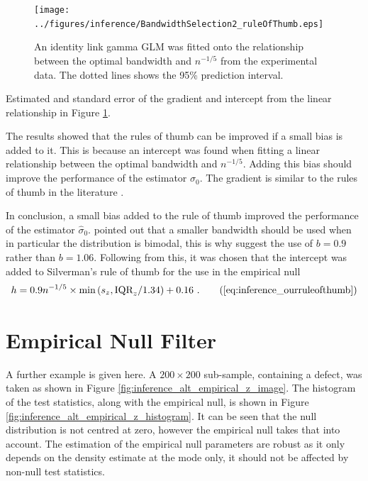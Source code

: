 \begin{figure}
  \centering
  \texttt{[image: ../figures/inference/BandwidthSelection2\_ruleOfThumb.eps]}
  \caption{An identity link gamma GLM was fitted onto the relationship between the optimal bandwidth and $n^{-1/5}$ from the experimental data. The dotted lines shows the 95\% prediction interval.}
  \label{fig:inference_BandwidthSelection2_ruleOfThumb}
\end{figure}

\begin{table}
  \centering
  
  \caption{Estimated and standard error of the gradient and intercept from the linear relationship in Figure \ref{fig:inference_BandwidthSelection2_ruleOfThumb}.}
  \label{table:inference_BandwidthSelection2_ruleOfThumb}
\end{table}

The results showed that the rules of thumb can be improved if a small bias is added to it. This is because an intercept was found when fitting a linear relationship between the optimal bandwidth and $n^{-1/5}$. Adding this bias should improve the performance of the estimator $\widehat{\sigma}_0$. The gradient is similar to the rules of thumb in the literature \citep{sheather2004density}.

In conclusion, a small bias added to the rule of thumb improved the performance of the estimator $\widehat{\sigma}_0$. \cite{silverman1986density} pointed out that a smaller bandwidth should be used when in particular the distribution is bimodal, this is why \cite{silverman1986density} suggest the use of $b=0.9$ rather than $b=1.06$. Following from this, it was chosen that the intercept was added to Silverman's rule of thumb for the use in the empirical null
\begin{equation}
  h = 0.9n^{-1/5}\times\text{min}\left(s_z,\text{IQR}_z/1.34\right) + 0.16
  \ .
  \tag{\ref{eq:inference_ourruleofthumb}}
\end{equation}

\section{Empirical Null Filter}

A further example is given here. A $200\times200$ sub-sample, containing a defect, was taken as shown in Figure \ref{fig:inference_alt_empirical_z_image}. The histogram of the test statistics, along with the empirical null, is shown in Figure \ref{fig:inference_alt_empirical_z_histogram}. It can be seen that the null distribution is not centred at zero, however the empirical null takes that into account. The estimation of the empirical null parameters are robust as it only depends on the density estimate at the mode only, it should not be affected by non-null test statistics.

